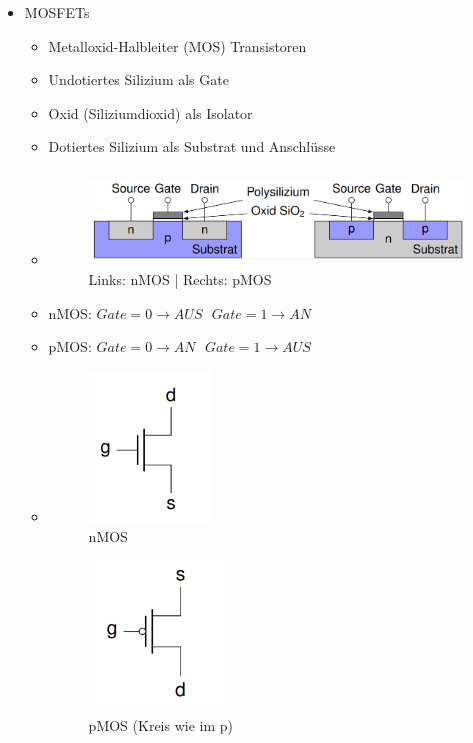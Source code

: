 \documentclass[11pt,a4paper]{article}
\begin{document}
\begin{itemize}
\begin{itemize}
	\item MOSFETs
		\begin{itemize}
		\item Metalloxid-Halbleiter (MOS) Transistoren
		\item Undotiertes Silizium als Gate
		\item Oxid (Siliziumdioxid) als Isolator
		\item Dotiertes Silizium als Substrat und Anschlüsse
		\item[] \begin{figure}[H]
				\begin{center}
				\includegraphics[height=2.5cm]{npmos}
				\caption{Links: nMOS | Rechts: pMOS}
				\end{center}
				\end{figure}
		\item nMOS: $Gate = 0 \rightarrow AUS ~~~ Gate = 1 \rightarrow AN$
		\item pMOS: $Gate = 0 \rightarrow AN ~~~ Gate = 1 \rightarrow AUS$
		\item[]
			\begin{minipage}{0.3\textwidth}
				\begin{figure}[H]
				\includegraphics[height=4cm]{nmos}
				\caption{nMOS}
				\end{figure}
			\end{minipage}
			\begin{minipage}[t]{0.4\textwidth}
				\begin{figure}[H]
				\vspace{-2.75cm}
				\includegraphics[height=4cm]{pmos}
				\caption{pMOS (Kreis wie im p)}
				\end{figure}
			\end{minipage}
		\end{itemize}
	\end{itemize}



\end{itemize}
\end{document}
